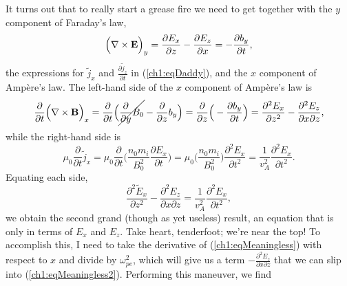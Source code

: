 It turns out that to really start a grease fire we need to get together with the
$y$ component of Faraday's law,
\begin{equation*}
  \Big ( {\bf \nabla} \times \mathbf{E} \Big )_y = \dfrac{\partial E_x}{\partial z} - \dfrac{\partial E_z}{\partial x} = - \dfrac{\partial b_y}{\partial t},
\end{equation*}
the expressions for $\tilde j_x$ and $\frac{\partial \tilde j_z}{\partial t}$ in
(\ref{ch1:eqDaddy}), and the $x$ component of Amp\`{e}re's law. The left-hand
side of the $x$ component of Amp\`{e}re's law is
\begin{equation*}
  \dfrac{\partial}{\partial t} \Big ( {\bf \nabla} \times \mathbf{B} \Big )_x = \dfrac{\partial}{\partial t} \Big ( \cancel{\dfrac{\partial}{\partial y} B_0} - \dfrac{\partial}{\partial z} b_y \Big ) = \dfrac{\partial}{\partial z} \Big ( - \dfrac{\partial b_y}{\partial t} \Big ) = \dfrac{\partial^2 E_x}{\partial z^2} - \dfrac{\partial^2 E_z}{\partial x \partial z},
\end{equation*}
while the right-hand side is 
\begin{equation*}
  \mu_0 \dfrac{\partial}{\partial t} \tilde j_x = \mu_0 \dfrac{\partial}{\partial t} \Big ( \dfrac{n_0 m_i}{B_0^2} \dfrac{\partial E_x}{\partial t} \Big ) = \mu_0 \Big ( \dfrac{n_0 m_i}{B_0^2} \Big ) \dfrac{\partial^2 E_x}{\partial t^2} = \dfrac{1}{v_A^2} \dfrac{\partial^2 E_x}{\partial t^2}.
\end{equation*}
Equating each side, 
\begin{equation} \label{ch1:eqMeaningless2} \dfrac{\partial^2 \tilde
    E_x}{\partial z^2} - \dfrac{\partial^2 E_z}{\partial x \partial z} =
  \dfrac{1}{v_A^2} \dfrac{\partial^2 E_x}{\partial t^2},
\end{equation}
we obtain the second grand (though as yet useless) result, an equation that is
only in terms of $E_x$ and $E_z$. Take heart, tenderfoot; we're near the top!
To accomplish this, I need
to %
take the derivative of (\ref{ch1:eqMeaningless}) with respect to $x$ and divide
by $\omega_{pe}^2$, which will give us a term
$-\frac{\partial^2 E_z}{\partial x \partial z}$ that we can slip into
(\ref{ch1:eqMeaningless2}). Performing this maneuver, we find
